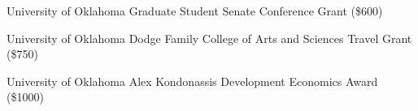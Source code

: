 {%
	University of Oklahoma}
{%
	Graduate Student Senate Conference Grant (\$600)}
{}

{%
	University of Oklahoma}
{%
	Dodge Family College of Arts and Sciences Travel Grant (\$750)}
{}

{%
	University of Oklahoma}
{%
	Alex Kondonassis Development Economics Award (\$1000)}
{}
